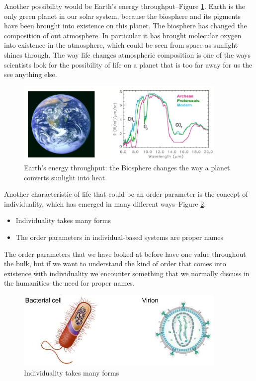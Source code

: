 \documentclass[]{article}
\begin{document}
Another possibility would be Earth's energy throughput--Figure  \ref{fig:EnergyThroughput}. Earth is the only green planet in our solar system, because the biosphere and its pigments have been brought into existence on this planet. The biosphere has changed the composition of out atmosphere. In particular it has brought molecular oxygen into existence in the atmosphere, which could be seen from space as sunlight shines through. The way life changes atmospheric composition is one of the ways scientists look for the possibility of life on a planet that is too far away for us the see anything else.

\begin{figure}[H]
	\caption[Earth’s energy throughput]{Earth’s energy throughput: the Biosphere changes the way a planet converts sunlight into heat.\cite{meadows2005modelling}}\label{fig:EnergyThroughput} 
	\includegraphics[width=0.9\textwidth]{EnergyThroughput}
\end{figure}

Another characteristic of life that could be an order parameter is the concept of individuality, which has emerged in many different ways--Figure \ref{fig:emergence-individuality}. 

\begin{itemize}
	\item Individuality takes many 	forms
	\item The order parameters in individual-based systems 	are proper names
\end{itemize}

The order parameters that we have looked at before have one value throughout the bulk, but if we want to understand the kind of order that comes into existence with individuality we encounter something that we normally discuss in the humanities--the need
for proper names.

\begin{figure}[H]
	\caption{Individuality takes many forms}\label{fig:emergence-individuality} 
	\includegraphics[width=0.9\textwidth]{emergence-individuality}
\end{figure}
\end{document}
